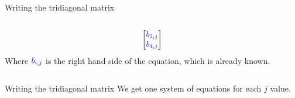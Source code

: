 \documentclass{beamer}
\begin{document}
\begin{frame}{Writing the tridiagonal matrix}
\begin{columns}
\begin{column}{0.7\textwidth}
{\begin{align*}
\begin{bmatrix}
                        \textcolor{blue}{b_{3,j}} \\
                        \textcolor{blue}{b_{4,j}} \\
                    \end{bmatrix}
                \end{align*}
            Where $\textcolor{blue}{b_{i,j}}$ is the right hand side of the equation, which is already known.
            }
        \end{column}
    \end{columns}
    \vspace{-1cm}
\end{frame}


\begin{frame}{Writing the tridiagonal matrix}
    \vspace{-0.8cm}   
    We get one system of equations for each $j$ value.
    
    \begin{columns}
        \begin{column}{0.3\textwidth}
            \begin{minipage}{0.48\textwidth}
\end{minipage}
\end{column}
\end{columns}
\end{frame}
\end{document}
